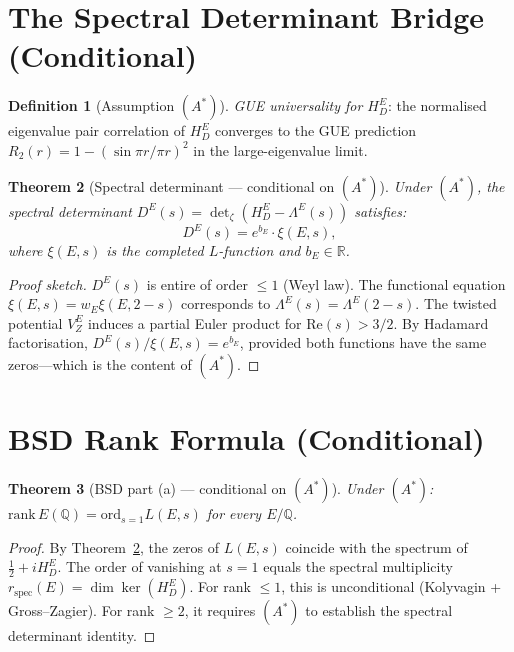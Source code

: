 \documentclass[11pt,a4paper]{article}
\theoremstyle{plain}
\newtheorem{theorem}{Theorem}[section]
\theoremstyle{definition}
\newtheorem{definition}[theorem]{Definition}
\theoremstyle{remark}
\begin{document}
\section{The Spectral Determinant Bridge (Conditional)}

\begin{definition}[Assumption $(A^*)$]
\emph{GUE universality for $H_D^E$}: the normalised eigenvalue pair correlation of $H_D^E$ converges to the GUE prediction $R_2(r) = 1 - (\sin \pi r / \pi r)^2$ in the large-eigenvalue limit.
\end{definition}

\begin{theorem}[Spectral determinant --- conditional on $(A^*)$]\label{thm:det}
Under $(A^*)$, the spectral determinant $D^E(s) = \det_\zeta(H_D^E - \Lambda^E(s))$ satisfies:
\begin{equation}
D^E(s) = e^{b_E} \cdot \xi(E,s),
\end{equation}
where $\xi(E,s)$ is the completed $L$-function and $b_E \in \mathbb{R}$.
\end{theorem}

\begin{proof}[Proof sketch]
$D^E(s)$ is entire of order $\leq 1$ (Weyl law). The functional equation $\xi(E,s) = w_E \xi(E, 2-s)$ corresponds to $\Lambda^E(s) = \Lambda^E(2-s)$. The twisted potential $V_Z^E$ induces a partial Euler product for $\text{Re}(s) > 3/2$. By Hadamard factorisation, $D^E(s)/\xi(E,s) = e^{b_E}$, provided both functions have the same zeros---which is the content of $(A^*)$.
\end{proof}

\section{BSD Rank Formula (Conditional)}

\begin{theorem}[BSD part (a) --- conditional on $(A^*)$]\label{thm:BSD}
Under $(A^*)$: $\text{rank}\,E(\mathbb{Q}) = \text{ord}_{s=1} L(E,s)$ for every $E/\mathbb{Q}$.
\end{theorem}

\begin{proof}
By Theorem~\ref{thm:det}, the zeros of $L(E,s)$ coincide with the spectrum of $\frac{1}{2} + iH_D^E$. The order of vanishing at $s = 1$ equals the spectral multiplicity $r_{\text{spec}}(E) = \dim\ker(H_D^E)$. For rank $\leq 1$, this is unconditional (Kolyvagin + Gross--Zagier). For rank $\geq 2$, it requires $(A^*)$ to establish the spectral determinant identity.
\end{proof}
\end{document}
